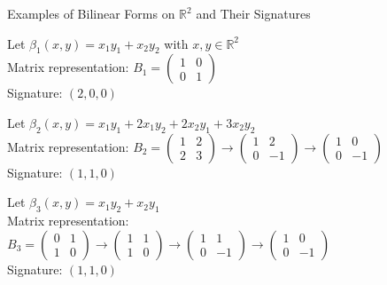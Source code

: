 \documentclass[fullscreen=true, bookmarks=true, hyperref={pdfencoding=unicode}]{beamer}
\begin{document}
\begin{frame}{Examples of Bilinear Forms on $\mathbb{R}^2$ and Their Signatures}
  \pause
  \begin{example}
  Let $\beta_1(x, y) = x_1y_1 + x_2y_2$ with $x, y \in \mathbb{R}^2$ \\
  Matrix representation: $B_1 = \begin{pmatrix} 1 & 0 \\ 0 & 1 \end{pmatrix}$ \\
  Signature: $(2, 0, 0)$
  \end{example}
  
  \pause
  \begin{example}
  Let $\beta_2(x, y) = x_1y_1 + 2x_1y_2 + 2x_2y_1 + 3x_2y_2$ \\
  Matrix representation: $B_2 = \begin{pmatrix} 1 & 2 \\ 2 & 3 \end{pmatrix}
  \to \begin{pmatrix} 1 & 2 \\ 0 & -1 \end{pmatrix}
  \to \begin{pmatrix} 1 & 0 \\ 0 & -1 \end{pmatrix}$ \\
  Signature: $(1, 1, 0)$
  \end{example}
  
  \pause
  \begin{example}
  Let $\beta_3(x, y) = x_1y_2 + x_2y_1$ \\
  Matrix representation: $B_3 = \begin{pmatrix} 0 & 1 \\ 1 & 0 \end{pmatrix}
  \to \begin{pmatrix} 1 & 1 \\ 1 & 0 \end{pmatrix}
  \to \begin{pmatrix} 1 & 1 \\ 0 & -1 \end{pmatrix}
  \to \begin{pmatrix} 1 & 0 \\ 0 & -1 \end{pmatrix}$ \\
  Signature: $(1, 1, 0)$
  \end{example}
\end{frame}
\end{document}
